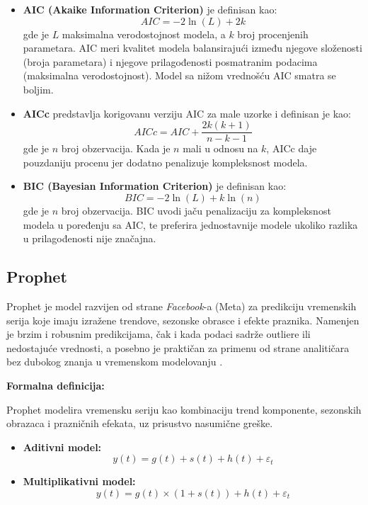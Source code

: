 \documentclass[12pt]{article}
\begin{document}
\begin{itemize}
    \item \textbf{AIC (Akaike Information Criterion)} je definisan kao:
    \begin{equation}
        AIC = -2 \ln(L) + 2k
    \end{equation}
    gde je $L$ maksimalna verodostojnost modela, a $k$ broj procenjenih parametara. AIC meri kvalitet modela balansirajući između njegove složenosti (broja parametara) i njegove prilagođenosti posmatranim podacima (maksimalna verodostojnost). Model sa nižom vrednošću AIC smatra se boljim.

    \item \textbf{AICc} predstavlja korigovanu verziju AIC za male uzorke i definisan je kao:
    \begin{equation}
        AICc = AIC + \frac{2k(k+1)}{n - k - 1}
    \end{equation}
    gde je $n$ broj obzervacija. Kada je $n$ mali u odnosu na $k$, AICc daje pouzdaniju procenu jer dodatno penalizuje kompleksnost modela.

    \item \textbf{BIC (Bayesian Information Criterion)} je definisan kao:
    \begin{equation}
        BIC = -2 \ln(L) + k \ln(n)
    \end{equation}
    gde je $n$ broj obzervacija. BIC uvodi jaču penalizaciju za kompleksnost modela u poređenju sa AIC, te preferira jednostavnije modele ukoliko razlika u prilagođenosti nije značajna.
\end{itemize}


\subsection{Prophet}

Prophet je model razvijen od strane \textit{Facebook}-a (Meta) za predikciju vremenskih serija koje imaju izražene trendove, sezonske obrasce i efekte praznika. Namenjen je brzim i robusnim predikcijama, čak i kada podaci sadrže outliere ili nedostajuće vrednosti, a posebno je praktičan za primenu od strane analitičara bez dubokog znanja u vremenskom modelovanju \cite{taylor2018}.

\textbf{Formalna definicija:}

Prophet modelira vremensku seriju kao kombinaciju trend komponente, sezonskih obrazaca i prazničnih efekata, uz prisustvo nasumične greške.

\begin{itemize}
    \item \textbf{Aditivni model:}
    \begin{equation}
        y(t) = g(t) + s(t) + h(t) + \varepsilon_t
    \end{equation}
    
    \item \textbf{Multiplikativni model:}
    \begin{equation}
        y(t) = g(t) \times (1 + s(t)) + h(t) + \varepsilon_t
    \end{equation}
\end{itemize}
\end{document}

